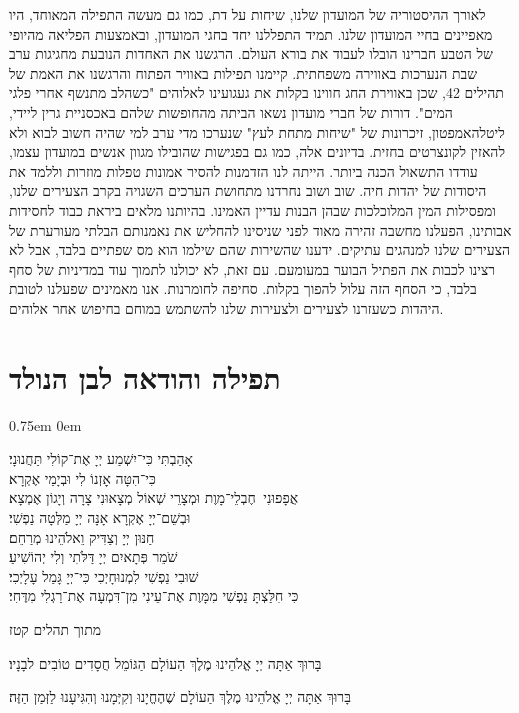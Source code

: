 \documentclass[14pt, article, extrafontsizes, twopage, a4paper]{memoir}
\newcommand{\attr}[1]{
{\raggedright\smaller#1}
}
\begin{document}
לאורך ההיסטוריה של המועדון שלנו, שיחות על דת, כמו גם מעשה התפילה המאוחד, היו מאפיינים בחיי המועדון שלנו. תמיד התפללנו יחד בחגי המועדון, ובאמצעות הפליאה מהיופי של הטבע חברינו הובלו לעבוד את בורא העולם. הרגשנו את האחדות הנובעת מחגיגות ערב שבת הנערכות באווירה משפחתית. קיימנו תפילות באוויר הפתוח והרגשנו את האמת של תהילים 42, שכן באווירת החג חווינו בקלות את געגועינו לאלוהים "כשהלב מתנשף אחרי פלגי המים". דורות של חברי מועדון נשאו הביתה מהחופשות שלהם באכסניית גרין ליידי, ליטלהאמפטון, זיכרונות של "שיחות מתחת לעץ" שנערכו מדי ערב למי שהיה חשוב לבוא ולא להאזין לקונצרטים בחזית. בדיונים אלה, כמו גם בפגישות שהובילו מגוון אנשים במועדון עצמו, עודדו התשאול הכנה ביותר. הייתה לנו הזדמנות להסיר אמונות טפלות מוזרות וללמד את היסודות של יהדות חיה. שוב ושוב נחרדנו מתחושת הערכים השגויה בקרב הצעירים שלנו, ומפסילות המין המלוכלכות שבהן הבנות עדיין האמינו. בהיותנו מלאים ביראת כבוד לחסידות אבותינו, הפעלנו מחשבה זהירה מאוד לפני שניסינו להחליש את נאמנותם הבלתי מעורערת של הצעירים שלנו למנהגים עתיקים. ידענו שהשירות שהם שילמו הוא מס שפתיים בלבד, אבל לא רצינו לכבות את הפתיל הבוער במעומעם. עם זאת, לא יכולנו לתמוך עוד במדיניות של סחף בלבד, כי הסחף הזה עלול להפוך בקלות. סחיפה לחומרנות. אנו מאמינים שפעלנו לטובת היהדות כשעזרנו לצעירים ולצעירות שלנו להשתמש במוחם בחיפוש אחר אלוהים.




\chapter{תפילה והודאה לבן הנולד}
\parskip 0.75em
\parindent 0em


אָהַבְתִּי כִּי־יִשְׁמַע יְיָ אֶת־קוֹלִי תַּחֲנוּנָי׃\\
כִּי־הִטָּה אׇזְנוֹ לִי וּבְיָמַי אֶקְרָא׃\\
אֲפָפוּנִי  חֶבְלֵי־מָוֶת וּמְצָרֵי שְׁאוֹל מְצָאוּנִי צָרָה וְיָגוֹן אֶמְצָא׃\\
וּבְשֵׁם־יְיָ אֶקְרָא אָנָּה יְיָ מַלְּטָה נַפְשִׁי׃\\
חַנּוּן יְיָ וְצַדִּיק וֵאלֹהֵינוּ מְרַחֵם׃\\
שֹׁמֵר פְּתָאיִם יְיָ דַּלֹּתִי וְלִי יְהוֹשִׁיעַ׃\\
שׁוּבִי נַפְשִׁי לִמְנוּחָיְכִי כִּי־יְיָ גָּמַל עָלָיְכִי׃\\
כִּי חִלַּצְתָּ נַפְשִׁי מִמָּוֶת אֶת־עֵינִי מִן־דִּמְעָה אֶת־רַגְלִי מִדֶּחִי׃
\attr{מתוך תהלים קטז}

בָּרוּךְ אַתָּה יְיָ אֱלֹהֵינוּ מֶלֶךְ הַעוֹלָם הַגּוֹמֵל חֲסָדִים טוֹבִים לבָנָיו׃

בָּרוּךְ אַתָּה יְיָ אֱלֹהֵינוּ מֶלֶךְ הַעוֹלָם שֶׁהֶחֱיָנוּ וְקִיְּמָנוּ וְהִגִּיעָנוּ לַזְּמַן הַזֶּה׃
\end{document}
